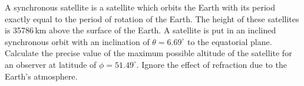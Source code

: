 A synchronous satellite is a satellite which orbits the Earth with its period
exactly equal to the period of rotation of the Earth. The height of these
satellites is 35786\,km above the surface of the Earth. A satellite is put in
an inclined synchronous orbit with an inclination of $\theta = 6.69^\circ$ to
the equatorial plane. Calculate the precise value of the maximum possible
altitude of the satellite for an observer at latitude of $\phi = 51.49^\circ$.
Ignore the effect of refraction due to the Earth's atmosphere.
